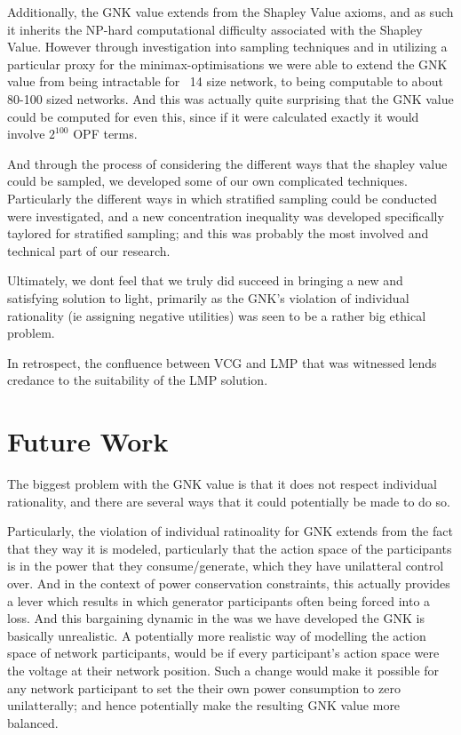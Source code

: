 Additionally, the GNK value extends from the Shapley Value axioms, and as such it inherits the NP-hard computational difficulty associated with the Shapley Value.
However through investigation into sampling techniques and in utilizing a particular proxy for the minimax-optimisations we were able to extend the GNK value from being intractable for ~14 size network, to being computable to about 80-100 sized networks.
And this was actually quite surprising that the GNK value could be computed for even this, since if it were calculated exactly it would involve $2^{100}$ OPF terms.

And through the process of considering the different ways that the shapley value could be sampled, we developed some of our own complicated techniques.
Particularly the different ways in which stratified sampling could be conducted were investigated, and a new concentration inequality was developed specifically taylored for stratified sampling; and this was probably the most involved and technical part of our research.

Ultimately, we dont feel that we truly did succeed in bringing a new and satisfying solution to light, primarily as the GNK's violation of individual rationality (ie assigning negative utilities) was seen to be a rather big ethical problem.

In retrospect, the confluence between VCG and LMP that was witnessed lends credance to the suitability of the LMP solution.


\section{Future Work}
\label{sec:future}

The biggest problem with the GNK value is that it does not respect individual rationality, and there are several ways that it could potentially be made to do so.

Particularly, the violation of individual ratinoality for GNK extends from the fact that they way it is modeled, particularly that the action space of the participants is in the power that they consume/generate, which they have unilatteral control over.
And in the context of power conservation constraints, this actually provides a lever which results in which generator participants often being forced into a loss.
And this bargaining dynamic in the was we have developed the GNK is basically unrealistic.
A potentially more realistic way of modelling the action space of network participants, would be if every participant's action space were the voltage at their network position.
Such a change would make it possible for any network participant to set the their own power consumption to zero unilatterally; and hence potentially make the resulting GNK value more balanced.

